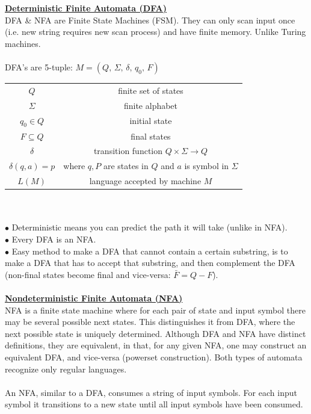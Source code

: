 \documentclass[8pt,letterpaper,twocolumn]{article}
\begin{document}
\\
\\
\underline{\textbf{Deterministic Finite Automata (DFA)}}\\
DFA \& NFA are Finite State Machines (FSM).
They can only scan input once (i.e. new string requires new scan process) and have finite memory.
Unlike Turing machines.\\
\\
DFA's are 5-tuple: $M = (Q,\, \Sigma,\, \delta,\, q_0,\, F)$
\begin{tabular}{c c} 
$Q$ & finite set of states \\  
$\Sigma$ & finite alphabet \\
$q_0 \in Q$ & initial state \\
$F \subseteq Q$ & final states \\
$\delta$ & transition function $Q \times \Sigma \rightarrow Q$ \\
$\delta(q,a) = p$ &  where $q, P$ are states in $Q$ and $a$ is symbol in $\Sigma$\\
$L(M)$ & language accepted by machine $M$
\end{tabular}\\
\\
$\bullet$ Deterministic means you can predict the path it will take (unlike in NFA).\\
$\bullet$ Every DFA is an NFA.\\
$\bullet$ Easy method to make a DFA that cannot contain a certain substring,
is to make a DFA that has to accept that substring, and then complement the DFA
(non-final states become final and vice-versa: $\bar{F} = Q-F$).\\
\\
\underline{\textbf{Nondeterministic Finite Automata (NFA)}}\\
NFA is a finite state machine where for each pair of state and input symbol there may be several
possible next states. This distinguishes it from DFA, where the next possible state is uniquely
determined. Although DFA and NFA have distinct definitions, they are equivalent, in that,
for any given NFA, one may construct an equivalent DFA, and vice-versa (powerset construction).
Both types of automata recognize only regular languages.\\
\\
An NFA, similar to a DFA, consumes a string of input symbols.
For each input symbol it transitions to a new state until all input symbols have been consumed.
\end{document}
